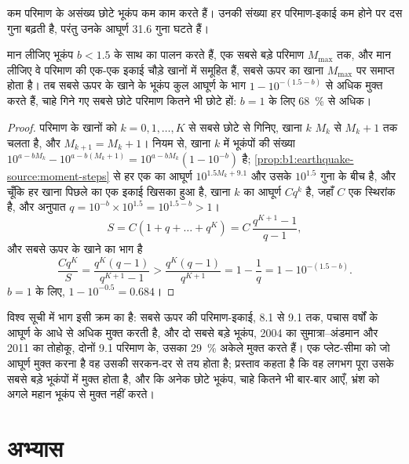 कम परिमाण के असंख्य छोटे भूकंप कम काम करते हैं। उनकी संख्या हर परिमाण-इकाई कम होने पर दस गुना बढ़ती है, परंतु उनके आघूर्ण 31.6 गुना घटते हैं।

\begin{proposition}
\label{prop:b1:earthquake-source:largest}
मान लीजिए भूकंप $b < 1.5$ के साथ  का पालन करते हैं, एक सबसे बड़े परिमाण $M_{\max}$ तक, और मान लीजिए वे परिमाण की एक-एक इकाई चौड़े खानों में समूहित हैं, सबसे ऊपर का खाना $M_{\max}$ पर समाप्त होता है। तब सबसे ऊपर के खाने के भूकंप कुल आघूर्ण के भाग $1 - 10^{-(1.5 - b)}$ से अधिक मुक्त करते हैं, चाहे गिने गए सबसे छोटे परिमाण कितने भी छोटे हों: $b = 1$ के लिए \qty{68}{\percent} से अधिक।
\end{proposition}

\begin{proof}
परिमाण के खानों को $k = 0, 1, \dots, K$ से सबसे छोटे से गिनिए, खाना $k$ $M_k$ से $M_k + 1$ तक चलता है, और $M_{k+1} = M_k + 1$। नियम से, खाना $k$ में भूकंपों की संख्या $10^{a - bM_k} - 10^{a - b(M_k+1)} =
10^{a - bM_k}(1 - 10^{-b})$ है; \cref{prop:b1:earthquake-source:moment-steps} से हर एक का आघूर्ण $10^{1.5M_k + 9.1}$ और उसके $10^{1.5}$ गुना के बीच है, और चूँकि हर खाना पिछले का एक इकाई खिसका हुआ है, खाना $k$ का आघूर्ण $C q^k$ है, जहाँ $C$ एक स्थिरांक है, और अनुपात $q = 10^{-b}\times10^{1.5} = 10^{1.5 - b} > 1$।
\[
  S = C(1 + q + \dots + q^K) = C\,\frac{q^{K+1} - 1}{q - 1} ,
\]
और सबसे ऊपर के खाने का भाग है
\[
  \frac{C q^K}{S} = \frac{q^K (q - 1)}{q^{K+1} - 1}
  > \frac{q^K (q - 1)}{q^{K+1}} = 1 - \frac1q = 1 - 10^{-(1.5 - b)} .
\]
$b = 1$ के लिए, $1 - 10^{-0.5} = 0.684$।
\end{proof}

विश्व सूची में भाग इसी क्रम का है: सबसे ऊपर की परिमाण-इकाई, 8.1 से 9.1 तक, पचास वर्षों के आघूर्ण के आधे से अधिक मुक्त करती है, और दो सबसे बड़े भूकंप, 2004 का सुमात्रा–अंडमान और 2011 का तोहोकू, दोनों 9.1 परिमाण के, उसका \qty{29}{\percent} अकेले मुक्त करते हैं। एक प्लेट-सीमा को जो आघूर्ण मुक्त करना है वह उसकी सरकन-दर से तय होता है; प्रस्ताव कहता है कि वह लगभग पूरा उसके सबसे बड़े भूकंपों में मुक्त होता है, और कि अनेक छोटे भूकंप, चाहे कितने भी बार-बार आएँ, भ्रंश को अगले महान भूकंप से मुक्त नहीं करते।

\section{अभ्यास}

